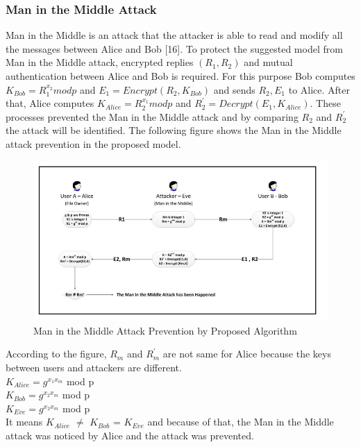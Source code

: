 \subsubsection{Man in the Middle Attack}
Man in the Middle is an attack that the attacker is able to
read and modify all the messages between Alice and Bob [16].
To protect the suggested model from Man in the Middle
attack, encrypted replies $(R_{1},R_{2})$ and mutual
authentication between Alice  and Bob  is
required. For this purpose Bob computes
$K_{Bob} = R_{1}^{x_{2}} mod p$
and $E_{1}=Encrypt(R_{2},K_{Bob})$ and sends $ R_{2},E_{1}$ to Alice.
After that, Alice computes $K_{Alice} = R_{2}^{x_{1}} mod p$
and $R^{'}_{2}=Decrypt(E_{1},K_{Alice}).$
These processes prevented the Man in the Middle attack and by comparing $R_{2}$ and $R^{'}_{2}$ the attack will be identified. The following figure shows the Man in the Middle attack prevention in the proposed model.

\vspace{-10pt}
\begin{figure}[H]
	\centering
	\includegraphics[width=160mm]{images/maninmiddle.png}{}
	\caption{ Man in the Middle Attack Prevention by Proposed Algorithm} %
	\label{figmaninmiddle} %
\end{figure}

According to the figure, $R_{m}$ and $R^{'}_{m}$ are not same for
Alice because the keys between users and attackers are
different.\\
{$K_{Alice} = g^{x_{1}{x_{m}}}$ mod p}\\
{$K_{Bob} = g^{x_{2}{x_{m}}}$ mod p}\\
{$K_{Eve} = g^{x_{2}{x_{m}}}$ mod p}\\
It means $K_{Alice}$ $\neq$ $K_{Bob}$ = $K_{Eve}$  and because of that, the
Man in the Middle attack was noticed by Alice and the attack
was prevented.

